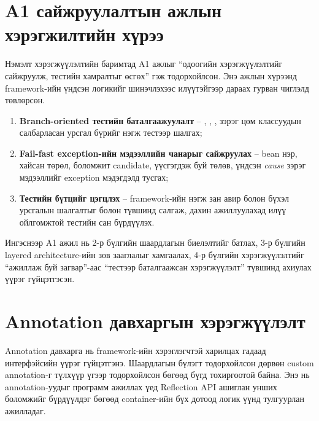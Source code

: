 \section{A1 сайжруулалтын ажлын хэрэгжилтийн хүрээ}

Нэмэлт хэрэгжүүлэлтийн баримтад A1 ажлыг ``одоогийн хэрэгжүүлэлтийг
сайжруулж, тестийн хамралтыг өсгөх'' гэж тодорхойлсон. Энэ ажлын
хүрээнд framework-ийн үндсэн логикийг шинэчлэхээс илүүтэйгээр дараах
гурван чиглэлд төвлөрсөн.

\begin{enumerate}
    \item \textbf{Branch-oriented тестийн баталгаажуулалт} --
    , ,
    ,  зэрэг цөм
    классуудын салбарласан урсгал бүрийг нэгж тестээр шалгах;
    \item \textbf{Fail-fast exception-ийн мэдээллийн чанарыг
    сайжруулах} -- bean нэр, хайсан төрөл, боломжит candidate,
    үүсгэгдэж буй төлөв, үндсэн \textit{cause} зэрэг мэдээллийг
    exception мэдэгдэлд тусгах;
    \item \textbf{Тестийн бүтцийг цэгцлэх} -- framework-ийн нэгж
    зан авир болон бүхэл урсгалын шалгалтыг  болон
     түвшинд салгаж, дахин ажиллуулахад илүү
    ойлгомжтой тестийн сан бүрдүүлэх.
\end{enumerate}

Ингэснээр A1 ажил нь 2-р бүлгийн шаардлагын биелэлтийг батлах, 3-р
бүлгийн layered architecture-ийн зөв зааглалыг хамгаалах, 4-р бүлгийн
хэрэгжүүлэлтийг ``ажиллаж буй загвар''-аас ``тестээр баталгаажсан
хэрэгжүүлэлт'' түвшинд ахиулах үүрэг гүйцэтгэсэн.

\section{Annotation давхаргын хэрэгжүүлэлт}

Annotation давхарга нь framework-ийн хэрэглэгчтэй харилцах гадаад
интерфэйсийн үүрэг гүйцэтгэнэ. Шаардлагын бүлэгт тодорхойлсон дөрвөн
custom annotation-г  түлхүүр үгээр тодорхойлсон бөгөөд
бүгд  тохиргоотой байна.
Энэ нь annotation-уудыг программ ажиллах үед Reflection API ашиглан унших
боломжийг бүрдүүлдэг бөгөөд container-ийн бүх дотоод логик үүнд
тулгуурлан ажилладаг.

